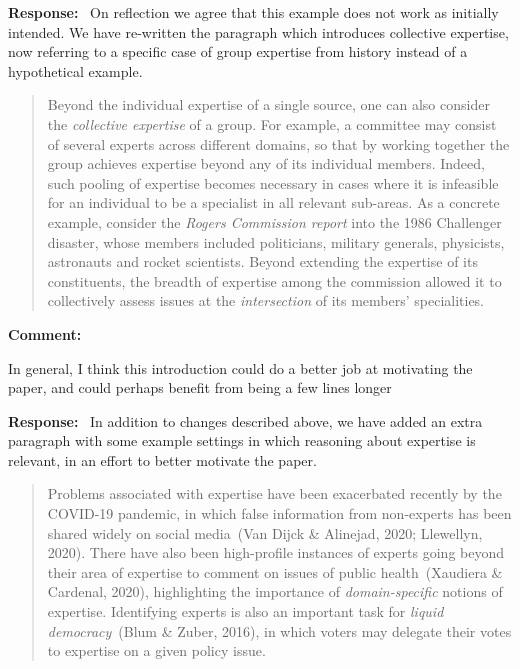 \documentclass[12pt]{article}
\newenvironment{comment}{
    \noindent\textbf{Comment:}\
    \em
}{\vspace{5mm}}
\newenvironment{response}{
    \noindent\textbf{Response:}\
}{\vspace{5mm}}
\begin{document}
\begin{response}
    On reflection we agree that this example does not work as initially
    intended. We have re-written the paragraph which introduces collective
    expertise, now referring to a specific case of group expertise from
    history instead of a hypothetical example.

    \begin{quotation}
        Beyond the individual expertise of a single source, one can also
        consider the \emph{collective expertise} of a group. For example, a
        committee may consist of several experts across different domains, so
        that by working together the group achieves expertise beyond any of its
        individual members. Indeed, such pooling of expertise becomes necessary
        in cases where it is infeasible for an individual to be a specialist in
        all relevant sub-areas. As a concrete example, consider the
        \emph{Rogers Commission report} into the 1986 Challenger disaster,
        whose members included politicians, military generals, physicists,
        astronauts and rocket scientists. Beyond extending the expertise of its
        constituents, the breadth of expertise among the commission allowed it
        to collectively assess issues at the \emph{intersection} of its
        members' specialities.
    \end{quotation}

\end{response}

\begin{comment}
    In general, I think this introduction could do a better job at motivating
    the paper, and could perhaps benefit from being a few lines longer
\end{comment}

\begin{response}
    In addition to changes described above, we have added an extra paragraph
    with some example settings in which reasoning about expertise is relevant,
    in an effort to better motivate the paper.

    \begin{quotation}
        Problems associated with expertise have been exacerbated recently by
        the COVID-19 pandemic, in which false information from non-experts has
        been shared widely on social media~(Van Dijck \& Alinejad, 2020;
        Llewellyn, 2020).  There have also been high-profile instances of
        experts going beyond their area of expertise to comment on issues of
        public health~(Xaudiera \& Cardenal, 2020), highlighting the importance
        of \emph{domain-specific} notions of expertise. Identifying experts is
        also an important task for \emph{liquid democracy}~(Blum \& Zuber,
        2016), in which voters may delegate their votes to expertise on a given
        policy issue.
    \end{quotation}
\end{response}
\end{document}

